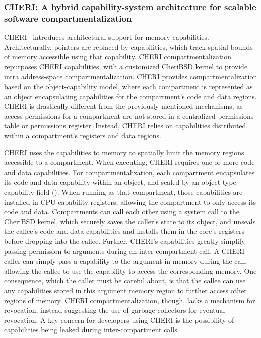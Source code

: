 \subsubsection{CHERI: A hybrid capability-system architecture for scalable 
            software compartmentalization}
CHERI~\cite{WoodruffWCMADLNNR14} introduces architectural support for 
memory capabilities.
Architecturally, pointers are replaced by capabilities, which track 
spatial bounds of memory accessible using that capability. 
CHERI compartmentalization~\cite{WatsonWNMACDDGL15} repurposes 
CHERI capabilities, with a customized CheriBSD
kernel to provide intra address-space compartmentalization.
CHERI provides compartmentalization based on the object-capability model, 
where each compartment is represented as an object encapsulating capabilities
for the compartment's code and data regions.
CHERI is drastically different from the previously mentioned mechanisms,
as access permissions for a compartment are not stored in a centralized
permissions table or permissions register.
Instead, CHERI relies on capabilities distributed within a compartment's 
registers and data regions.

CHERI uses the capabilities to memory to spatially limit the memory regions
accessible to a compartment.
When executing, CHERI requires one or more code and data capabilities. 
For compartmentalization, each compartment encapsulates its code and data
capability within an object, and sealed by an object type capability 
field (). 
When running as that compartment, those capabilities are installed in CPU
capability registers, allowing the compartment to only access its code and data.
Compartments can call each other using a system call to the CheriBSD kernel,
which securely saves the caller's state to its object, and unseals the
callee's code and data capabilities and installs them in the core's registers 
before dropping into the callee.
Further, CHERI's capabilities greatly simplify passing permission to arguments
during an inter-compartment call.
A CHERI caller can simply pass a capability to the argument in memory during
the call, allowing the callee to use the capability to access the corresponding
memory.
One consequence, which the caller must be careful about, is that the callee can
use any capabilities stored in this argument memory region to further access other
regions of memory.
CHERI compartmentalization, though, lacks a mechanism for revocation,
instead suggesting the use of garbage collectors for eventual revocation.
A key concern for developers using CHERI is the possibility of capabilities
being leaked during inter-compartment calls.

